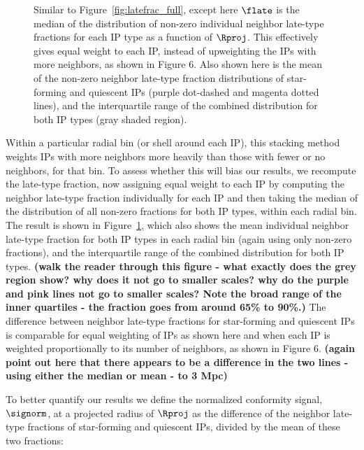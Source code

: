 \begin{figure}
  \epstrim{0.5in 0.1in 0.3in 0.3in}
  \caption{
Similar to Figure~\ref{fig:latefrac_full}, except here $\flate$ is the median of 
the distribution of non-zero individual neighbor late-type fractions for each IP type as a function of $\Rproj$.  This effectively gives equal weight to each IP, instead of upweighting the IPs with more neighbors, as shown in Figure 6.
Also shown here is the mean of the non-zero neighbor late-type fraction distributions of star-forming and quiescent IPs (purple dot-dashed and magenta dotted lines),
and the interquartile range of the combined distribution for both IP types (gray shaded region).
}
  \label{fig:latefrac_quartiles}
\end{figure}


Within a particular radial bin (or shell around each IP), this stacking method 
weights IPs with more neighbors more heavily than those with fewer or no neighbors,
for that bin.
To assess whether this will bias our results, we recompute the late-type fraction, 
now assigning equal weight to each IP by computing the neighbor late-type fraction 
individually for each IP and then taking the median of the distribution of all 
non-zero fractions for both IP types, within each radial bin.
The result is shown in Figure~\ref{fig:latefrac_quartiles}, which also shows the 
mean individual neighbor late-type fraction for both IP types in each radial bin (again using
only non-zero fractions), and the interquartile range of the combined distribution for both IP types. {\bf(walk the reader through this figure - what exactly does the grey region show?  why does it not go to smaller scales?  why do the purple and pink lines not go to smaller scales?  Note the broad range of the inner quartiles - the fraction goes from around 65\% to 90\%.)}
The difference between neighbor late-type fractions for star-forming and quiescent IPs is comparable for equal weighting of IPs as shown here and when each IP is weighted
proportionally to its number of neighbors, as shown in Figure 6.
{\bf(again point out here that there appears to be a difference in the two lines - using either the median or mean - to 3 Mpc)}






To better quantify our results we define the normalized conformity signal, 
$\signorm$, at a projected radius of $\Rproj$ as the difference of the neighbor late-type fractions of star-forming and quiescent IPs, 
divided by the mean of these two fractions:

